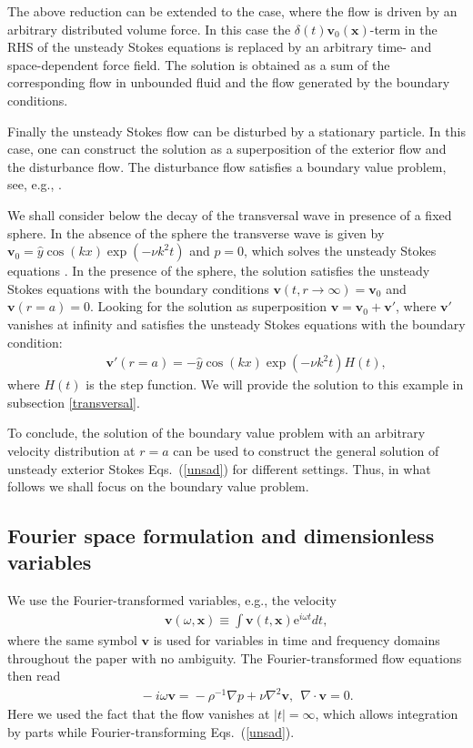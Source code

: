 \documentclass[aps,prx,twocolumn,amsmath,amssymb,amsfonts]{revtex4-2}
\newcommand{\re}{\mathrm{e}}            %
\newcommand{\red}[1]{{\color{red}#1}}
\begin{document}
The above reduction can be extended to the case, where the flow is driven by an arbitrary distributed volume force. In this case
the $\delta(t)\bm v_0(\bm x)$-term in the RHS of the unsteady Stokes equations is replaced by an arbitrary time- and space-dependent force field. The solution is obtained as a sum of the corresponding flow in unbounded fluid and the flow generated by the boundary conditions.

Finally the unsteady Stokes flow can be disturbed by a stationary particle. In this case, one can construct the solution as a superposition of the exterior flow and the disturbance flow. The disturbance flow satisfies a boundary value problem, see, e.g., \cite{Yang}.

We shall consider below the decay of the transversal wave in presence of a fixed sphere. In the absence of the sphere the transverse wave is given by $\bm v_0={\hat y}\cos(kx)\exp(-\nu k^2 t)$ and $p=0$, which solves the unsteady Stokes equations \cite{reichl}. In the presence of the sphere, the solution satisfies the unsteady Stokes equations with the boundary conditions $\bm v(t, r\to\infty)=\bm v_0$ and $\bm v(r=a)=0$.  Looking for the solution as superposition $\bm v=\bm v_0+\bm v'$, where $\bm v'$ vanishes at infinity and satisfies the unsteady Stokes equations with the boundary condition:
\begin{eqnarray}&&\!\!\!\!\!\!\!\!\!\!\!\!\!
\bm v'(r=a)=-{\hat y}\cos(kx)\exp(-\nu k^2 t)H(t), \label{bcv}
\end{eqnarray}
where $H(t)$ is the step function. We will provide the solution to this example in subsection \ref{transversal}.

To conclude, the solution of the boundary value problem with an arbitrary velocity distribution at $r=a$ can be used to construct the general solution of unsteady exterior Stokes Eqs.~(\ref{unsad}) for different settings. Thus, in what follows we shall focus on the boundary value problem.



\subsection{Fourier space formulation and dimensionless variables}

We use the Fourier-transformed variables, e.g., the velocity
\begin{eqnarray}&&\!\!\!\!\!\!\!\!\!\!\!\!\!
\bm v(\omega, \bm x)\equiv\int \bm v(t, \bm x) \re^{i\omega t} dt,\label{sc}
\end{eqnarray}
where the same symbol $\bm v$ is used for variables in time and frequency domains throughout the paper with no ambiguity. The Fourier-transformed flow equations then read
\begin{eqnarray}&&\!\!\!\!\!\!\!\!\!\!\!\!\!
-i\omega \bm v\!=\!-\rho^{-1} \nabla p\!+\!\nu \nabla^2\bm v,\ \ \nabla\cdot\bm v\!=\!0. \label{freqs}
\end{eqnarray}
Here we used the fact that the flow vanishes at $|t|=\infty$, which allows integration by parts while Fourier-transforming Eqs.~(\ref{unsad}).
\end{document}
